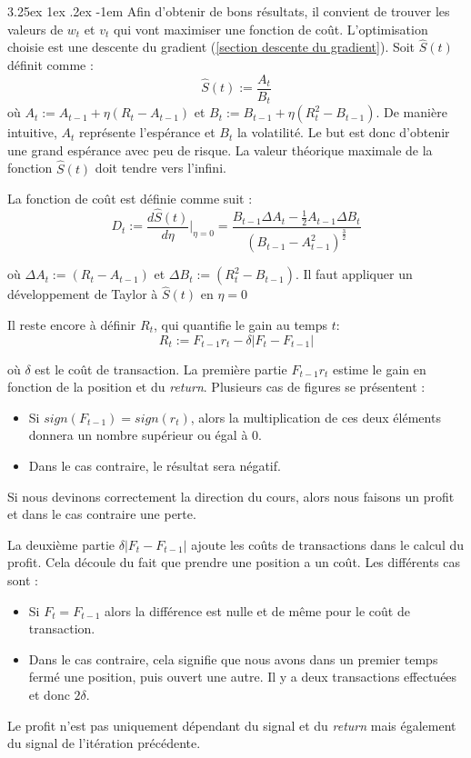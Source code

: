 \documentclass[a4paper, 11pt]{article}
\makeatletter
\renewcommand\paragraph{\@startsection{paragraph}{5}{\z@}%
  {3.25ex \@plus1ex \@minus.2ex}%
  {-1em}%
  {\normalfont\normalsize\bfseries}}
\makeatother
\begin{document}
\paragraph{}
Afin d'obtenir de bons résultats, il convient de trouver les valeurs de $w_t$ et $v_t$ qui vont maximiser une fonction de coût. L'optimisation choisie
est une descente du gradient (\ref{section descente du gradient}).
Soit $\widehat{S}(t)$ définit comme :
$$\widehat{S}(t) := \frac{A_t}{B_t}$$
où $A_t := A_{t-1} + \eta (R_t - A_{t-1})$ et $B_t := B_{t-1} + \eta (R_t^2 - B_{t-1})$.
De manière intuitive, $A_t$ représente l'espérance et $B_t$ la volatilité. Le but est donc d'obtenir une grand espérance avec peu de risque. La valeur
théorique maximale de la fonction $\widehat{S}(t)$ doit tendre vers l'infini.

La fonction de coût est définie comme suit :
$$D_t := \frac{d\widehat{S}(t)}{d\eta}|_{\eta=0} = \frac{B_{t-1}\Delta A_t - \frac{1}{2} A_{t-1}\Delta B_t}{(B_{t-1} - A_{t-1}^2)^{\frac{3}{2}}}$$

où $\Delta A_t := (R_t - A_{t-1})$ et $\Delta B_t := (R_t^2 - B_{t-1})$. Il faut appliquer un développement de Taylor à $\widehat{S}(t)$ en $\eta=0$


Il reste encore à définir $R_t$, qui quantifie le gain au temps $t$:
$$R_t := F_{t-1} r_t - \delta |F_t - F_{t-1}|$$

où $\delta$ est le coût de transaction.
La première partie $F_{t-1} r_t$ estime le gain en fonction de la position et du \textit{return}. Plusieurs cas de figures se présentent :
\begin{itemize}
 \item Si $sign(F_{t-1}) = sign(r_t)$, alors la multiplication de ces deux éléments donnera un nombre supérieur ou égal à 0.
 \item Dans le cas contraire, le résultat sera négatif.
\end{itemize}
Si nous devinons correctement la direction du cours, alors nous faisons un profit et dans le cas contraire une perte.

La deuxième partie $\delta |F_t - F_{t-1}|$ ajoute les coûts de transactions dans le calcul du profit. Cela découle du fait que prendre une position a
un coût. Les différents cas sont :
\begin{itemize}
 \item Si $F_t = F_{t-1}$ alors la différence est nulle et de même pour le coût de transaction.
 \item Dans le cas contraire, cela signifie que nous avons dans un premier temps fermé une position, puis ouvert une autre. Il y a deux transactions
 effectuées et donc $2 \delta$.
\end{itemize}
Le profit n'est pas uniquement dépendant du signal et du \textit{return} mais également du signal de l'itération précédente.
\end{document}
